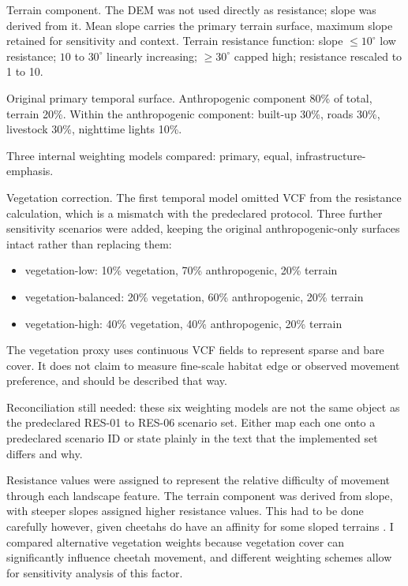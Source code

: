 \begin{outline}

Terrain component. The DEM was not used directly as resistance; slope was derived from
it. Mean slope carries the primary terrain surface, maximum slope retained for
sensitivity and context. Terrain resistance function: slope $\le 10^\circ$ low
resistance; $10$ to $30^\circ$ linearly increasing; $\ge 30^\circ$ capped high;
resistance rescaled to 1 to 10.

Original primary temporal surface. Anthropogenic component 80\% of total, terrain 20\%.
Within the anthropogenic component: built-up 30\%, roads 30\%, livestock 30\%,
nighttime lights 10\%.

Three internal weighting models compared: primary, equal, infrastructure-emphasis.

Vegetation correction. The first temporal model omitted VCF from the resistance
calculation, which is a mismatch with the predeclared protocol. Three further
sensitivity scenarios were added, keeping the original anthropogenic-only surfaces
intact rather than replacing them:
\begin{itemize}
  \item vegetation-low: 10\% vegetation, 70\% anthropogenic, 20\% terrain
  \item vegetation-balanced: 20\% vegetation, 60\% anthropogenic, 20\% terrain
  \item vegetation-high: 40\% vegetation, 40\% anthropogenic, 20\% terrain
\end{itemize}
The vegetation proxy uses continuous VCF fields to represent sparse and bare cover. It
does not claim to measure fine-scale habitat edge or observed movement preference, and
should be described that way.

Reconciliation still needed: these six weighting models are not the same object as the
predeclared RES-01 to RES-06 scenario set. Either map each one onto a predeclared
scenario ID or state plainly in the text that the implemented set differs and why.
\end{outline}

Resistance values were assigned to represent the relative difficulty of movement through each landscape feature. The terrain component was derived from slope, with steeper slopes assigned higher resistance values. This had to be done carefully however, given cheetahs do have an affinity for some sloped terrains . I compared alternative vegetation weights because vegetation cover can significantly influence cheetah movement, and different weighting schemes allow for sensitivity analysis of this factor.


